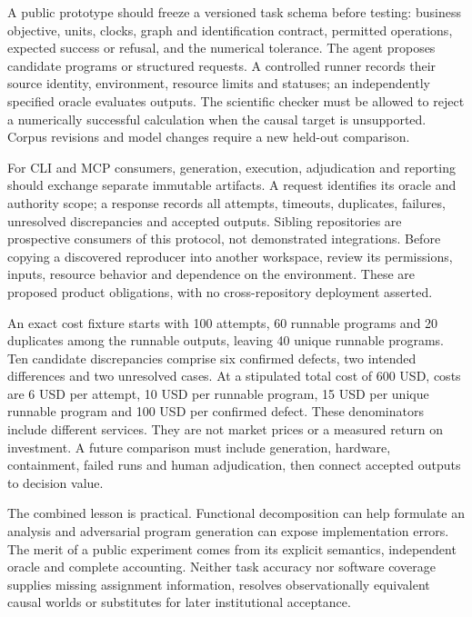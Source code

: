 A public prototype should freeze a versioned task schema before testing: business objective, units, clocks, graph and identification contract, permitted operations, expected success or refusal, and the numerical tolerance. The agent proposes candidate programs or structured requests. A controlled runner records their source identity, environment, resource limits and statuses; an independently specified oracle evaluates outputs. The scientific checker must be allowed to reject a numerically successful calculation when the causal target is unsupported. Corpus revisions and model changes require a new held-out comparison.~\citep{exec24_affordance_fuzzing_reference}

For CLI and MCP consumers, generation, execution, adjudication and reporting should exchange separate immutable artifacts. A request identifies its oracle and authority scope; a response records all attempts, timeouts, duplicates, failures, unresolved discrepancies and accepted outputs. Sibling repositories are prospective consumers of this protocol, not demonstrated integrations. Before copying a discovered reproducer into another workspace, review its permissions, inputs, resource behavior and dependence on the environment. These are proposed product obligations, with no cross-repository deployment asserted.~\citep{exec24_affordance_fuzzing_reference}

An exact cost fixture starts with 100 attempts, 60 runnable programs and 20 duplicates among the runnable outputs, leaving 40 unique runnable programs. Ten candidate discrepancies comprise six confirmed defects, two intended differences and two unresolved cases. At a stipulated total cost of 600 USD, costs are 6 USD per attempt, 10 USD per runnable program, 15 USD per unique runnable program and 100 USD per confirmed defect. These denominators include different services. They are not market prices or a measured return on investment. A future comparison must include generation, hardware, containment, failed runs and human adjudication, then connect accepted outputs to decision value.~\citep{exec24_affordance_fuzzing_reference}

The combined lesson is practical. Functional decomposition can help formulate an analysis and adversarial program generation can expose implementation errors. The merit of a public experiment comes from its explicit semantics, independent oracle and complete accounting. Neither task accuracy nor software coverage supplies missing assignment information, resolves observationally equivalent causal worlds or substitutes for later institutional acceptance.~\citep{exec24_affordance_fuzzing_reference}


